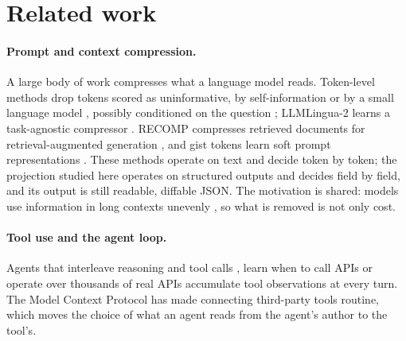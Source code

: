 \section{Related work}
\label{sec:related}

\paragraph{Prompt and context compression.} A large body of work compresses what a language model reads.
Token-level methods drop tokens scored as uninformative, by self-information \citep{li2023compressing} or by a
small language model \citep{jiang2023llmlingua}, possibly conditioned on the question
\citep{jiang2024longllmlingua}; LLMLingua-2 learns a task-agnostic compressor \citep{pan2024llmlingua2}. RECOMP
compresses retrieved documents for retrieval-augmented generation \citep{xu2024recomp}, and gist tokens learn soft
prompt representations \citep{mu2023gist}. These methods operate on text and decide token by token; the projection
studied here operates on structured outputs and decides field by field, and its output is still readable,
diffable JSON. The motivation is shared: models use information in long contexts unevenly \citep{liu2024lost}, so
what is removed is not only cost.

\paragraph{Tool use and the agent loop.} Agents that interleave reasoning and tool calls \citep{yao2023react},
learn when to call APIs \citep{schick2023toolformer} or operate over thousands of real APIs \citep{qin2024toolllm}
accumulate tool observations at every turn. The Model Context Protocol \citep{mcp2026spec} has made connecting
third-party tools routine, which moves the choice of what an agent reads from the agent's author to the tool's.

